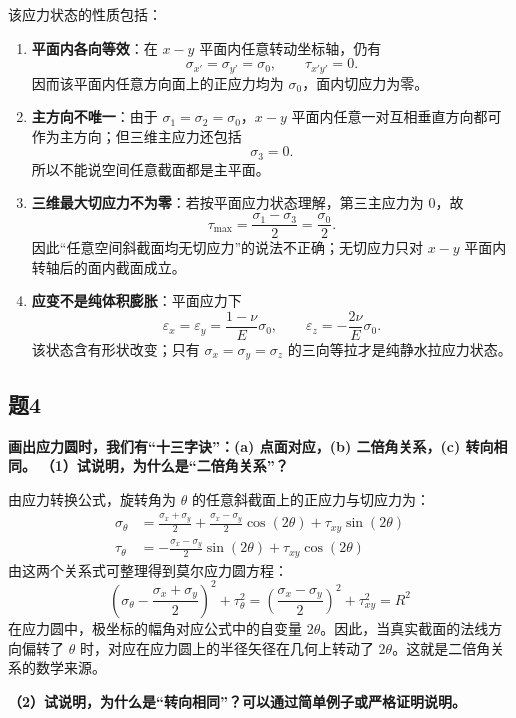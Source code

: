\documentclass[11pt,a4paper]{ctexrep}
\begin{document}
{该应力状态的性质包括：
\begin{enumerate}
    \item \textbf{平面内各向等效}：在 $x-y$ 平面内任意转动坐标轴，仍有
    \[
    \sigma_{x'}=\sigma_{y'}=\sigma_0,\qquad \tau_{x'y'}=0.
    \]
    因而该平面内任意方向面上的正应力均为 $\sigma_0$，面内切应力为零。
    \item \textbf{主方向不唯一}：由于 $\sigma_1=\sigma_2=\sigma_0$，$x-y$ 平面内任意一对互相垂直方向都可作为主方向；但三维主应力还包括
    \[
    \sigma_3=0.
    \]
    所以不能说空间任意截面都是主平面。
    \item \textbf{三维最大切应力不为零}：若按平面应力状态理解，第三主应力为 $0$，故
    \[
    \tau_{\max}=\frac{\sigma_1-\sigma_3}{2}=\frac{\sigma_0}{2}.
    \]
    因此“任意空间斜截面均无切应力”的说法不正确；无切应力只对 $x-y$ 平面内转轴后的面内截面成立。
    \item \textbf{应变不是纯体积膨胀}：平面应力下
    \[
    \varepsilon_x=\varepsilon_y=\frac{1-\nu}{E}\sigma_0,\qquad
    \varepsilon_z=-\frac{2\nu}{E}\sigma_0.
    \]
    该状态含有形状改变；只有 $\sigma_x=\sigma_y=\sigma_z$ 的三向等拉才是纯静水拉应力状态。
\end{enumerate}

\subsection*{题4}
\textbf{画出应力圆时，我们有“十三字诀”：(a) 点面对应，(b) 二倍角关系，(c) 转向相同。}
\textbf{（1）试说明，为什么是“二倍角关系”？}

由应力转换公式，旋转角为 $\theta$ 的任意斜截面上的正应力与切应力为：
\[
    \begin{aligned}
        \sigma_\theta &= \frac{\sigma_x + \sigma_y}{2} + \frac{\sigma_x - \sigma_y}{2} \cos(2\theta) + \tau_{xy} \sin(2\theta) \\
        \tau_\theta &= -\frac{\sigma_x - \sigma_y}{2} \sin(2\theta) + \tau_{xy} \cos(2\theta)
    \end{aligned}
\]
由这两个关系式可整理得到莫尔应力圆方程：
\[
    \left(\sigma_\theta - \frac{\sigma_x + \sigma_y}{2}\right)^2 + \tau_\theta^2 = \left(\frac{\sigma_x - \sigma_y}{2}\right)^2 + \tau_{xy}^2 = R^2
\]
在应力圆中，极坐标的幅角对应公式中的自变量 $2\theta$。因此，当真实截面的法线方向偏转了 $\theta$ 时，对应在应力圆上的半径矢径在几何上转动了 $2\theta$。这就是二倍角关系的数学来源。

\textbf{（2）试说明，为什么是“转向相同”？可以通过简单例子或严格证明说明。}

}
\end{document}
